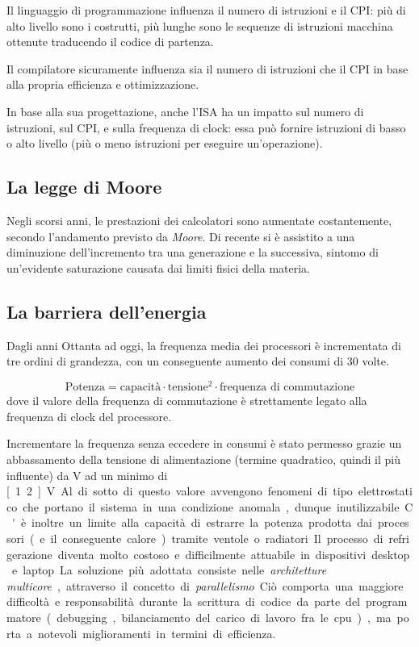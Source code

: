 \documentclass[class=book, crop=false, oneside]{standalone}
\begin{document}
Il linguaggio di programmazione influenza il numero di istruzioni e il CPI: più di alto livello sono i costrutti, più lunghe sono le sequenze di istruzioni macchina ottenute traducendo il codice di partenza.

Il compilatore sicuramente influenza sia il numero di istruzioni che il CPI in base alla propria efficienza e ottimizzazione.

In base alla sua progettazione, anche l'ISA ha un impatto sul numero di istruzioni, sul CPI, e sulla frequenza di clock: essa può fornire istruzioni di basso o alto livello (più o meno istruzioni per eseguire un'operazione).

\subsection{La legge di Moore}
Negli scorsi anni, le prestazioni dei calcolatori sono aumentate costantemente, secondo l'andamento previsto da \emph{Moore}. Di recente si è assistito a una diminuzione dell’incremento tra una generazione e la successiva, sintomo di un'evidente saturazione causata dai limiti fisici della materia.

\subsection{La barriera dell'energia}
Dagli anni Ottanta ad oggi, la frequenza media dei processori è incrementata di tre ordini di grandezza, con un conseguente aumento dei consumi di 30 volte.

\begin{equation*}
\text{Potenza} = \text{capacità} \cdot \text{tensione}^2 \cdot \text{frequenza di commutazione}
\end{equation*}
dove il valore della frequenza di commutazione è strettamente legato alla frequenza di clock del processore.

Incrementare la frequenza senza eccedere in consumi è stato permesso grazie un abbassamento della tensione di alimentazione (termine quadratico, quindi il più influente) da \unit[5]{V} ad un minimo di \unit[1.2]{V}.
Al di sotto di questo valore avvengono fenomeni di tipo elettrostatico che portano il sistema in una condizione anomala, dunque inutilizzabile.

C'è inoltre un limite alla capacità di estrarre la potenza prodotta dai processori (e il conseguente calore) tramite ventole o radiatori.
Il processo di refrigerazione diventa molto costoso e difficilmente attuabile in dispositivi desktop e laptop.

La soluzione più adottata consiste nelle \emph{architetture multicore}, attraverso il concetto di \emph{parallelismo}.
Ciò comporta una maggiore difficoltà e responsabilità durante la scrittura di codice da parte del programmatore (debugging, bilanciamento del carico di lavoro fra le \acrshort{cpu}), ma porta a notevoli miglioramenti in termini di efficienza.
\end{document}
